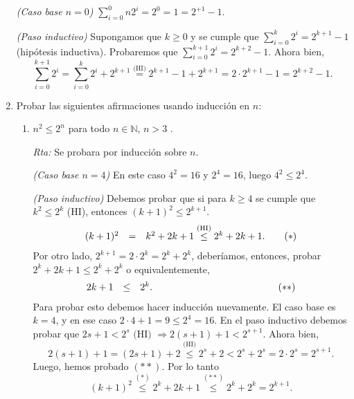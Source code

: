 \documentclass[a4paper,12pt,twoside,spanish,reqno]{amsbook}
\numberwithin{equation}{section}
\newcommand{\rta}{\noindent\textit{Rta: }}
\begin{document}
\begin{enumerate}
        \textit{(Caso base $n=0$) }  $\sum_{i=0}^0n 2^i = 2^0 = 1 = 2^{+1} -1$.
        
        \textit{(Paso inductivo) } Supongamos que $k\ge 0$ y se cumple que  $\sum_{i=0}^k 2^i = 2^{k+1} -1$ (hipótesis inductiva). Probaremos que  $\sum_{i=0}^{k+1} 2^i = 2^{k+2} -1$. Ahora bien, 
        \begin{equation*}
        \sum_{i=0}^{k+1} 2^i = \sum_{i=0}^{k} 2^i + 2^{k+1} \overset{\text{(HI)}}{=}  2^{k+1} -1 + 2^{k+1} = 2 \cdot 2^{k+1} -1 = 2^{k+2} -1.
        \end{equation*}
        
        
        
        
        
        \item Probar las siguientes afirmaciones usando inducción en $n$:
        \begin{enumerate}
            \item $n^2\leq 2^n$ para todo $n\in{\mathbb N}$, $n>3$ .
            
            \rta  Se probara por inducción sobre $n$. 
            
            \textit{(Caso base $n=4$) } En  este caso $4^2 = 16$ y $2^4 = 16$, luego $4^2 \le 2^4$.
            
            \textit{(Paso inductivo)} Debemos probar que si para $k \ge 4$ se cumple  que  $k^2\leq 2^k$ (HI),  entonces $(k+1)^2\leq 2^{k+1}$. 
            \begin{equation*}
            \begin{array}{rclr}
            (k+1)^2 &=& k^2 + 2k +1 \overset{\text{(HI)}}{\le} 2^k +2k +1. \hfill &\quad \hfill(*)
            \end{array}
            \end{equation*}
            Por otro lado, $2^{k+1} = 2 \cdot 2^k = 2^k + 2^k$, deberíamos,  entonces,  probar $2^k +2k +1 \le 2^k +2^k$ o equivalentemente, 
            \begin{equation*}
            \begin{array}{rclr}
            2k +1   &\le&2^k. \hfill &\qquad\qquad\qquad\qquad\qquad\qquad \hfill\hfill(**)
            \end{array}
            \end{equation*}
            Para probar esto debemos hacer inducción nuevamente. El caso base es $k=4$, y en ese caso $2\cdot 4+ 1 = 9 \le 2^4 = 16$. En  el paso inductivo debemos probar que $2s+ 1 < 2^s \text{ (HI) } \Rightarrow 2(s+1)+ 1 < 2^{s+1}$. Ahora bien, 
            \begin{equation*}
            2(s+1)+ 1  = (2s + 1) +2 \overset{\text{(HI)}}{\le} 2^s + 2 < 2^s + 2^s = 2\cdot 2^s = 2^{s+1}. 
            \end{equation*}    
            Luego,  hemos probado $(**)$. Por lo tanto
            \begin{equation*}
            (k+1)^2 \overset{(*)}{\le}  2^k +2k +1 \overset{(**)}{\le} 2^k + 2^k = 2^{k+1}.
            \end{equation*}
            

\end{enumerate}
\end{enumerate}
\end{document}
